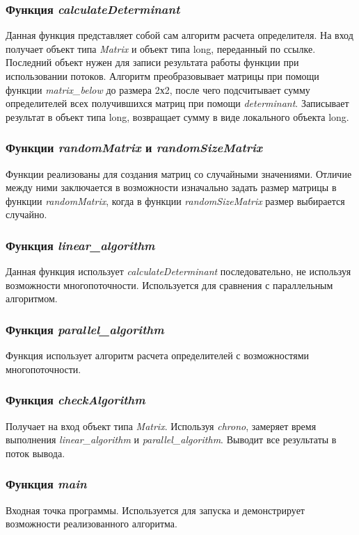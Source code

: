 \documentclass[a4paper, 12pt]{article}
\begin{document}
\subsubsection{Функция \textit{calculateDeterminant}}
Данная функция представляет собой сам алгоритм расчета определителя. На вход получает
объект типа \textit{Matrix} и объект типа long, переданный по ссылке.
Последний объект нужен для записи результата работы функции при использовании
потоков. Алгоритм преобразовывает матрицы при помощи функции \textit{matrix\_below}
до размера 2х2, после чего подсчитывает сумму определителей всех получившихся матриц при
помощи \textit{determinant}. Записывает результат в объект типа long, возвращает
сумму в виде локального объекта long.

\subsubsection{Функции \textit{randomMatrix} и \textit{randomSizeMatrix}}
Функции реализованы для создания матриц со случайными значениями. Отличие между ними
заключается в возможности изначально задать размер матрицы в функции \textit{randomMatrix},
когда в функции \textit{randomSizeMatrix} размер выбирается случайно. 

\subsubsection{Функция \textit{linear\_algorithm}}
Данная функция использует \textit{calculateDeterminant} последовательно,
не используя возможности многопоточности. Используется для сравнения с 
параллельным алгоритмом.

\subsubsection{Функция \textit{parallel\_algorithm}}
Функция использует алгоритм расчета определителей с возможностями многопоточности.

\subsubsection{Функция \textit{checkAlgorithm}}
Получает на вход объект типа \textit{Matrix}. Используя \textit{chrono}, 
замеряет время выполнения \textit{linear\_algorithm} и \textit{parallel\_algorithm}.
Выводит все результаты в поток вывода.

\subsubsection{Функция \textit{main}}
Входная точка программы. Используется для запуска и демонстрирует возможности реализованного алгоритма.
\end{document}
